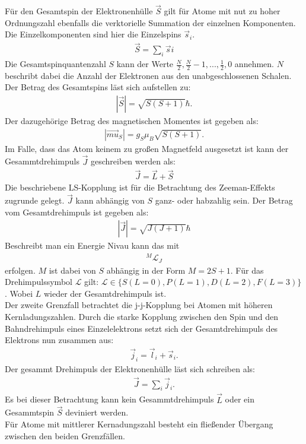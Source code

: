Für den Gesamtspin der Elektronenhülle $\vec{S}$ gilt für Atome mit nut zu hoher Ordnungszahl ebenfalls die verktorielle Summation der einzelnen Komponenten.
Die Einzelkomponenten sind hier die Einzelspins $\vec{s}_i$.
\begin{align*}
  \vec{S} = \sum_{i}{\vec{s}i}
\end{align*}
Die Gesamtspinquantenzahl $S$ kann der Werte $\frac{N}{2}, \frac{N}{2}-1, ..., \frac{1}{2},0$ annehmen.
$N$ beschribt dabei die Anzahl der Elektronen aus den unabgeschlossenen Schalen.
Der Betrag des Gesamtspins läst sich aufstellen zu:
\begin{align*}
  |\vec{S}| = \sqrt{S(S+1)}\hbar.
\end{align*}
Der dazugehörige Betrag des magnetischen Momentes ist gegeben als:
\begin{align*}
  |\vec{mu}_S| = g_S\mu_B\sqrt{S(S+1)}.
\end{align*}
Im Falle, dass das Atom keinem zu großen Magnetfeld ausgesetzt ist kann der Gesammtdrehimpuls $\vec{J}$ geschreiben werden als:
\begin{align*}
  \vec{J} = \vec{L}+ \vec{S}
\end{align*}
Die beschriebene LS-Kopplung ist für die Betrachtung des Zeeman-Effekts zugrunde gelegt.
$\vec{J}$ kann abhängig von $S$ ganz- oder habzahlig sein.
Der Betrag vom Gesamtdrehimpuls ist gegeben als:
\begin{align*}
  |\vec{J}| = \sqrt{J(J+1)}\hbar
\end{align*}
Beschreibt man ein Energie Nivau kann das mit
\begin{align*}
  {}^M\mathcal{L}_J
\end{align*}
erfolgen.
$M$ ist dabei von $S$ abhängig in der Form $M=2S+1$.
Für das Drehimpulssymbol $\mathcal{L}$ gilt:
$\mathcal{L}\in\{S(L=0), P(L=1), D(L=2), F(L=3)\}$.
Wobei $L$ wieder der Gesamtdrehimpuls ist.\\

Der zweite Grenzfall betrachtet die j-j-Kopplung bei Atomen mit höheren Kernladungszahlen.
Durch die starke Kopplung zwischen den Spin und den Bahndrehimpuls eines Einzelelektrons setzt sich der Gesamtdrehimpuls des Elektrons nun zusammen aus:
\begin{align*}
  \vec{j}_i = \vec{l}_i + \vec{s}_i.
\end{align*}
Der gesammt Drehimpuls der Elektronenhülle läst sich schreiben als:
\begin{align*}
  \vec{J}=\sum_i\vec{j}_i.
\end{align*}
Es bei dieser Betrachtung kann kein Gesammtdrehimpuls $\vec{L}$ oder ein Gesammtspin $\vec{S}$ deviniert werden.\\
Für Atome mit mittlerer Kernadungszahl besteht ein fließender Übergang zwischen den beiden Grenzfällen.

